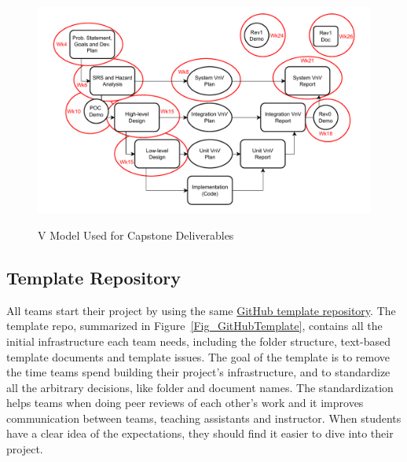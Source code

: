 \documentclass[10pt, conference]{IEEEtran}
\begin{document}
\begin{figure}[h!]
  \hspace{-0.6cm}
    {
      \includegraphics[width=1.1\columnwidth]{./figures/CourseStructure.drawio.pdf}
    }
    \caption{\label{Fig_VModel} V Model Used for Capstone Deliverables}
\end{figure}
\subsection{Template Repository} \label{Sec_Template}

All teams start their project by using the same
\href{https://github.com/smiths/capTemplate}{GitHub template repository}. The template repo, summarized
in Figure~\ref{Fig_GitHubTemplate}, contains all the initial infrastructure each
team needs, including the folder structure, text-based template documents and
template issues. The goal of the template is to remove the time teams spend
building their project's infrastructure, and to standardize all the arbitrary
decisions, like folder and document names. The
standardization helps teams when doing peer reviews of each other's work and it
improves communication between teams, teaching assistants and instructor.
When students have a clear idea of the expectations, they should find it easier
to dive into their project.
\end{document}

